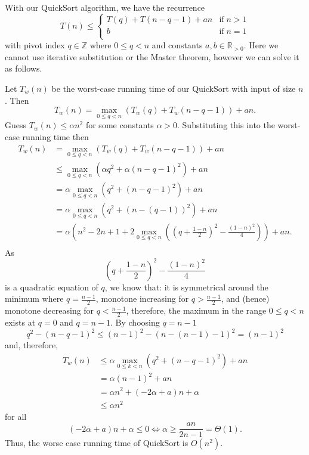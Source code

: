\begin{example}
    With our QuickSort algorithm, we have the recurrence 
    \[
        T(n)\leq
        \begin{cases}
            T(q)+T(n-q-1)+an&\text{if}\;n>1\\
            b&\text{if}\;n=1\\
        \end{cases}
    \]
    with pivot index $q\in\mathbb Z$ where $0\leq q<n$ and constants $a,b\in\mathbb R_{>0}$. Here we cannot use iterative substitution or the Master theorem, however we can solve it as follows.
    
    Let $T_w(n)$ be the worst-case running time of our QuickSort with input of size $n$. Then \[T_w(n)=\max_{0\leq q<n}(T_w(q)+T_w(n-q-1))+an.\] Guess $T_w(n)\leq\alpha n^2$ for some constants $\alpha>0$. Substituting this into the worst-case running time then
    \begin{align*}
        T_w(n)&=\max_{0\leq q<n}(T_w(q)+T_w(n-q-1))+an\\
        &\leq\max_{0\leq q<n}(\alpha q^2+\alpha(n-q-1)^2)+an\\
        &=\alpha\max_{0\leq q<n}(q^2+(n-q-1)^2)+an\\
        &=\alpha\max_{0\leq q<n}(q^2+(n-(q-1))^2)+an\\
        &=\alpha\left(n^2-2n+1+2\max_{0\leq q<n}\left(\left(q+\frac{1-n}2\right)^2-\frac{(1-n)^2}4\right)\right)+an.\\
    \end{align*}
    As \[\left(q+\frac{1-n}2\right)^2-\frac{(1-n)^2}4\] is a quadratic equation of $q$, we know that: it is symmetrical around the minimum where $q=\frac{n-1}2$, monotone increasing for $q>\frac{n-1}2$, and (hence) monotone decreasing for $q<\frac{n-1}2$, therefore, the maximum in the range $0\leq q<n$ exists at $q=0$ and $q=n-1$. By choosing $q=n-1$ \[q^2-(n-q-1)^2\leq(n-1)^2-(n-(n-1)-1)^2=(n-1)^2\] and, therefore,
    \begin{align*}
        T_w(n)&\leq\alpha\max_{0\leq k<n}(q^2+(n-q-1)^2)+an\\
        &=\alpha(n-1)^2+an\\
        &=\alpha n^2+(-2\alpha+a)n+\alpha\\
        &\leq\alpha n^2
    \end{align*}
    for all \[(-2\alpha+a)n+\alpha\leq 0\iff\alpha\geq\frac{an}{2n-1}=\Theta(1).\] Thus, the worse case running time of QuickSort is $O(n^2)$.
\end{example}

